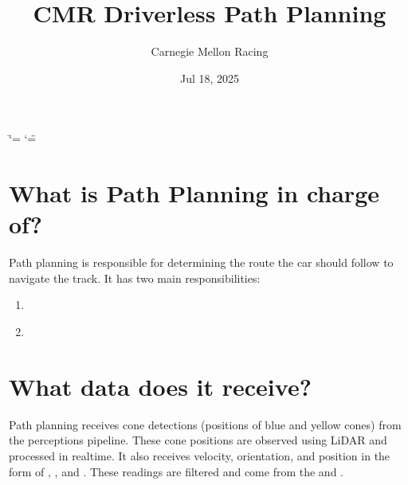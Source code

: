 \documentclass[letterpaper,10pt,english]{sphinxmanual}
\title{CMR Driverless Path Planning}
\date{Jul 18, 2025}
\author{Carnegie Mellon Racing}
\begin{document}
\ifdefined\shorthandoff
  \ifnum\catcode`\=\string=\active\shorthandoff{=}\fi
  \ifnum\catcode`\"=\active{}\fi
\fi

\pagestyle{empty}
\sphinxmaketitle
\pagestyle{plain}
\sphinxtableofcontents
\pagestyle{normal}
\label{\detokenize{index::doc}}



\chapter{What is Path Planning in charge of?}
\label{\detokenize{index:what-is-path-planning-in-charge-of}}
\sphinxAtStartPar
Path planning is responsible for determining the route the car should follow to navigate the track. It has two main responsibilities:
\begin{enumerate}
%
\item {} 
\sphinxAtStartPar
{}

\item {} 
\sphinxAtStartPar
{\hyperref[\detokenize{glossary:term-SLAM}]{}} 

\end{enumerate}


\chapter{What data does it receive?}
\label{\detokenize{index:what-data-does-it-receive}}
\sphinxAtStartPar
Path planning receives cone detections (positions of blue and yellow cones) from the perceptions pipeline. These cone positions are observed using LiDAR and processed in real\sphinxhyphen{}time. It also receives velocity, orientation, and position in the form of {\hyperref[\detokenize{glossary:term-Twist}]{}}, {\hyperref[\detokenize{glossary:term-Quaternion}]{}}, and {\hyperref[\detokenize{glossary:term-Pose}]{}}. These readings are filtered and come from the {\hyperref[\detokenize{glossary:term-IMU}]{}} and {\hyperref[\detokenize{glossary:term-GPS}]{}}.
\end{document}
